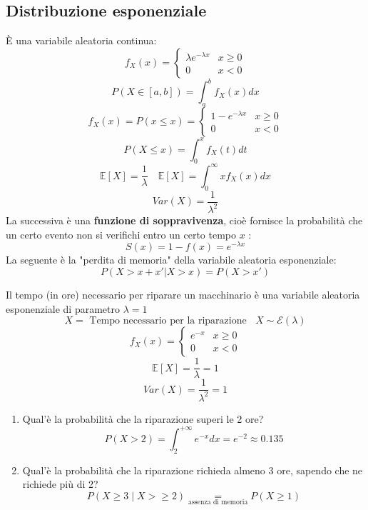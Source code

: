 \documentclass[a4paper]{article}
\theoremstyle{break}
\theoremstyle{break}
\theoremstyle{break}
\theoremstyle{break}
\begin{document}
\subsection{Distribuzione esponenziale}
È una variabile aleatoria continua:
\[
f_X(x) = \begin{cases}
  \lambda e^{-\lambda x} & x \ge 0 \\
  0 & x < 0
\end{cases}
\] 
\[
  P(X \in [a,b]) = \int_a^b f_X(x) dx
\] 
\[
f_X(x) = P(x \le x) = \begin{cases}
  1-e^{-\lambda x} & x \ge 0 \\
  0 & x < 0
\end{cases}
\] 
\[
  P(X \le x) = \int_{0}^x f_X(t) dt
\] 
\[
  \mathbb{E}[X] = \frac{1}{\lambda} \quad \mathbb{E}[X] = \int_{0}^{\infty} x f_X(x) dx
\] 
\[
  Var(X) = \frac{1}{\lambda^2}
\] 
La successiva è una \textbf{funzione di soppravivenza}, cioè fornisce la probabilità che
un certo evento non si verifichi entro un certo tempo \( x \) :
\[
  S(x) = 1-f(x) = e^{-\lambda x}
\] 
La seguente è la "perdita di memoria" della variabile aleatoria esponenziale:
\[
 P(X > x+x' | X>x) = P(X > x')
\] 

\begin{example}
  Il tempo (in ore) necessario per riparare un macchinario è una variabile aleatoria
  esponenziale di parametro \( \lambda = 1 \) 
  \[
  X = \text{ Tempo necessario per la riparazione } \;\; X \sim \mathcal{E}(\lambda)
  \] 
  \[
  f_X(x) = \begin{cases}
    e^{-x} & x \ge 0 \\
    0 & x < 0
  \end{cases}
  \] 
  \[
  \mathbb{E}[X] = \frac{1}{\lambda} = 1
  \] 
  \[
  Var(X) = \frac{1}{\lambda^2} = 1
  \] 
  \begin{enumerate}
    \item Qual'è la probabilità che la riparazione superi le 2 ore?
      \[
        P(X >2) = \int_2^{+\infty} e^{-x} dx = e^{-2} \approx 0.135
      \] 
    \item Qual'è la probabilità che la riparazione richieda almeno 3 ore, sapendo che
      ne richiede più di 2?
      \[
        P(X \ge 3 \;|\; X> \ge 2) \underset{\text{assenza di memoria}}{=} P(X \ge 1)
      \] 
  \end{enumerate}
\end{example}
\end{document}
